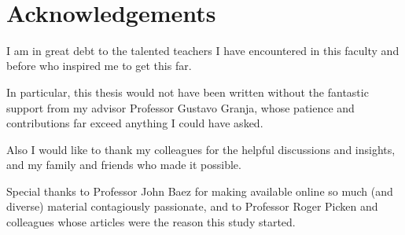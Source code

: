 \parbox[t][2cm][c]{\textwidth}{~\vfill}
\section*{Acknowledgements}


I am in great debt to the talented teachers I have encountered in this faculty and before who inspired me to get this far.

In particular, this thesis would not have been written without the fantastic support from my advisor Professor Gustavo Granja, whose patience and contributions far exceed anything I could have asked.

Also I would like to thank my colleagues for the helpful discussions and insights, and my family and friends who made it possible.

Special thanks to Professor John Baez for making available online so much (and diverse) material contagiously passionate, and to Professor Roger Picken and colleagues whose articles were the reason this study started.